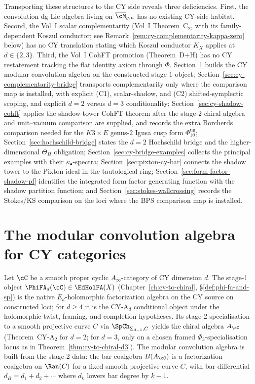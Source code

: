 Transporting these structures to the CY side reveals three deficiencies.
First, the convolution dg Lie algebra living on $\overline{\cM}_{g,n}$
has no existing CY-side habitat. Second, the Vol~I scalar
complementarity (Vol~I Theorem~C$_2$, with its family-dependent Koszul
conductor; see Remark~\ref{rem:cy-complementarity-kappa-zero} below) has
no CY translation stating which Koszul conductor $K_X$ applies at
$d \in \{2, 3\}$. Third, the Vol~I CohFT promotion (Theorem~D$+$H) has
no CY restatement tracking the flat identity axiom through $\Phi$.
Section~\ref{sec:modular-conv-cy} builds the CY modular convolution
algebra on the constructed stage-$1$ object; Section~\ref{sec:cy-complementarity-bridge}
transports complementarity only where the comparison map is installed,
with explicit (C1), scalar-shadow, and (C2) shifted-symplectic scoping,
and explicit $d = 2$ versus $d = 3$ conditionality;
Section~\ref{sec:cy-shadow-cohft} applies the
shadow-tower CohFT theorem after the stage-$2$ chiral algebra and
unit--vacuum comparison are supplied, and records the extra Borcherds
comparison needed for the $K3 \times E$ genus-$2$ Igusa cusp form
$\Phi_{10}^{\mathrm{un}}$; Section~\ref{sec:hochschild-bridge} states the $d=2$
Hochschild bridge and the higher-dimensional $\Theta_H$ obligation;
Section~\ref{sec:cy-bridge-examples} collects the principal examples
with their $\kappa_\bullet$-spectra; Section~\ref{sec:pixton-cy-bar}
connects the shadow tower to the Pixton ideal in the tautological ring;
Section~\ref{sec:form-factor-shadow-pf} identifies the integrated form
factor generating function with the shadow partition function; and
Section~\ref{sec:stokes-wallcrossing} records the Stokes/KS comparison
on the loci where the BPS comparison map is installed.



\section{The modular convolution algebra for CY categories}
\label{sec:modular-conv-cy}

Let $\cC$ be a smooth proper cyclic $A_\infty$-category of CY dimension
$d$. The stage-1 object $\PhiFA_d(\cC) \in \EdHolFA(X)$
(Chapter~\ref{ch:cy-to-chiral}, \S\ref{def:phi-fa-and-sp}) is the
native $E_d$-holomorphic factorization algebra on the CY source on
constructed loci; for $d\geq4$ it is the CY-A$_d$ conditional object
under the holomorphic-twist, framing, and completion hypotheses.
Its stage-2 specialisation to a smooth projective curve $C$
via $\SpCh_{\Sigma_{d-1},C}$ yields the chiral algebra $A_\cC$
(Theorem~CY-A$_2$ for $d = 2$; for $d = 3$, only on a chosen framed
$\Phi_3$-specialisation locus as in Theorem~\ref{thm:cy-to-chiral-d3}).
The modular convolution algebra is built from the stage-2 data: the bar
coalgebra $B(A_\cC)$ is a factorization coalgebra on $\Ran(C)$ for a
fixed smooth projective curve $C$, with bar differential
$d_B = d_1 + d_2 + \cdots$ where $d_k$ lowers bar degree by $k - 1$.

